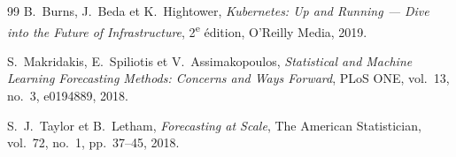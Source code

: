 \begin{thebibliography}{99}
B.~Burns, J.~Beda et K.~Hightower,
\textit{Kubernetes: Up and Running --- Dive into the Future of Infrastructure},
2\textsuperscript{e} édition, O'Reilly Media, 2019.


S.~Makridakis, E.~Spiliotis et V.~Assimakopoulos,
\textit{Statistical and Machine Learning Forecasting Methods: Concerns and Ways Forward},
PLoS ONE, vol.~13, no.~3, e0194889, 2018.

S.~J.~Taylor et B.~Letham,
\textit{Forecasting at Scale},
The American Statistician, vol.~72, no.~1, pp.~37--45, 2018.

\end{thebibliography}

